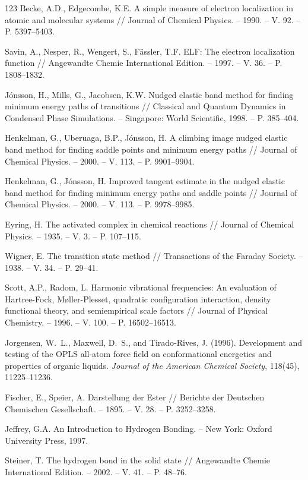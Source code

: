 \documentclass[12pt,a4paper]{report}
\begin{document}
\begin{thebibliography}{123}
 Becke, A.D., Edgecombe, K.E. A simple measure of electron localization in atomic and molecular systems // Journal of Chemical Physics. – 1990. – V. 92. – P. 5397–5403.

 Savin, A., Nesper, R., Wengert, S., Fässler, T.F. ELF: The electron localization function // Angewandte Chemie International Edition. – 1997. – V. 36. – P. 1808–1832.

 Jónsson, H., Mills, G., Jacobsen, K.W. Nudged elastic band method for finding minimum energy paths of transitions // Classical and Quantum Dynamics in Condensed Phase Simulations. – Singapore: World Scientific, 1998. – P. 385–404.

 Henkelman, G., Uberuaga, B.P., Jónsson, H. A climbing image nudged elastic band method for finding saddle points and minimum energy paths // Journal of Chemical Physics. – 2000. – V. 113. – P. 9901–9904.

 Henkelman, G., Jónsson, H. Improved tangent estimate in the nudged elastic band method for finding minimum energy paths and saddle points // Journal of Chemical Physics. – 2000. – V. 113. – P. 9978–9985.

 Eyring, H. The activated complex in chemical reactions // Journal of Chemical Physics. – 1935. – V. 3. – P. 107–115.

 Wigner, E. The transition state method // Transactions of the Faraday Society. – 1938. – V. 34. – P. 29–41.

 Scott, A.P., Radom, L. Harmonic vibrational frequencies: An evaluation of Hartree-Fock, Møller-Plesset, quadratic configuration interaction, density functional theory, and semiempirical scale factors // Journal of Physical Chemistry. – 1996. – V. 100. – P. 16502–16513.

 Jorgensen, W.~L., Maxwell, D.~S., and Tirado-Rives, J. (1996). Development and testing of the OPLS all-atom force field on conformational energetics and properties of organic liquids. \textit{Journal of the American Chemical Society}, 118(45), 11225–11236.

 Fischer, E., Speier, A. Darstellung der Ester // Berichte der Deutschen Chemischen Gesellschaft. – 1895. – V. 28. – P. 3252–3258.

 Jeffrey, G.A. An Introduction to Hydrogen Bonding. – New York: Oxford University Press, 1997.

 Steiner, T. The hydrogen bond in the solid state // Angewandte Chemie International Edition. – 2002. – V. 41. – P. 48–76.


\end{thebibliography}
\end{document}
